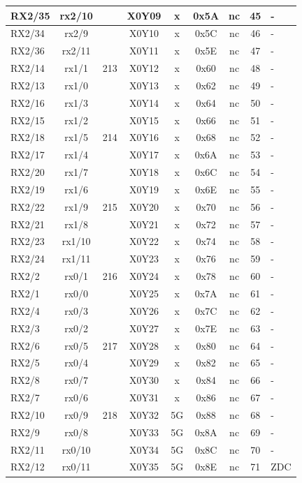 \begin{longtable}{|l|c|c|c|c|c|c|c|l|}
RX2/35 & rx2/10 &     & X0Y09 &  x  & 0x5A & nc & 45 & -\\\hline   
RX2/34 & rx2/9  &     & X0Y10 &  x  & 0x5C & nc & 46 & -\\\hline   
RX2/36 & rx2/11 &     & X0Y11 &  x  & 0x5E & nc & 47 & -\\\hline   
RX2/14 & rx1/1  & 213 & X0Y12 &  x  & 0x60 & nc & 48 & -\\\hline   
RX2/13 & rx1/0  &     & X0Y13 &  x  & 0x62 & nc & 49 & -\\\hline   
RX2/16 & rx1/3  &     & X0Y14 &  x  & 0x64 & nc & 50 & -\\\hline   
RX2/15 & rx1/2  &     & X0Y15 &  x  & 0x66 & nc & 51 & -\\\hline   
RX2/18 & rx1/5  & 214 & X0Y16 &  x  & 0x68 & nc & 52 & -\\\hline   
RX2/17 & rx1/4  &     & X0Y17 &  x  & 0x6A & nc & 53 & -\\\hline   
RX2/20 & rx1/7  &     & X0Y18 &  x  & 0x6C & nc & 54 & -\\\hline   
RX2/19 & rx1/6  &     & X0Y19 &  x  & 0x6E & nc & 55 & -\\\hline   
RX2/22 & rx1/9  & 215 & X0Y20 &  x  & 0x70 & nc & 56 & -\\\hline   
RX2/21 & rx1/8  &     & X0Y21 &  x  & 0x72 & nc & 57 & -\\\hline   
RX2/23 & rx1/10 &     & X0Y22 &  x  & 0x74 & nc & 58 & -\\\hline   
RX2/24 & rx1/11 &     & X0Y23 &  x  & 0x76 & nc & 59 & -\\\hline   
RX2/2  & rx0/1  & 216 & X0Y24 &  x  & 0x78 & nc & 60 & -\\\hline   
RX2/1  & rx0/0  &     & X0Y25 &  x  & 0x7A & nc & 61 & -\\\hline   
RX2/4  & rx0/3  &     & X0Y26 &  x  & 0x7C & nc & 62 & -\\\hline   
RX2/3  & rx0/2  &     & X0Y27 &  x  & 0x7E & nc & 63 & -\\\hline   
RX2/6  & rx0/5  & 217 & X0Y28 &  x  & 0x80 & nc & 64 & -\\\hline   
RX2/5  & rx0/4  &     & X0Y29 &  x  & 0x82 & nc & 65 & -\\\hline   
RX2/8  & rx0/7  &     & X0Y30 &  x  & 0x84 & nc & 66 & -\\\hline   
RX2/7  & rx0/6  &     & X0Y31 &  x  & 0x86 & nc & 67 & -\\\hline   
RX2/10 & rx0/9  & 218 & X0Y32 &  5G & 0x88 & nc & 68 & -\\\hline   
RX2/9  & rx0/8  &     & X0Y33 &  5G & 0x8A & nc & 69 & -\\\hline   
RX2/11 & rx0/10 &     & X0Y34 &  5G & 0x8C & nc & 70 & -\\\hline   
RX2/12 & rx0/11 &     & X0Y35 &  5G & 0x8E & nc & 71 & ZDC\\\hline   
\end{longtable}                  

